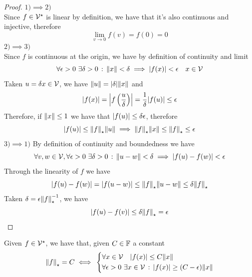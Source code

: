 \documentclass[../complete.tex]{subfiles}
\begin{document}
\begin{proof}
	$1)\implies{}2)$\\
	Since $f\in\mathcal{V}^\star$ is linear by definition, we have that it's also continuous and injective, therefore
	\begin{equation*}
		\lim_{v\to0}f(v)=f(0)=0
	\end{equation*}
	$2)\implies{}3)$\\
	Since $f$ is continuous at the origin, we have by definition of continuity and limit
	\begin{equation*}
		\forall\epsilon>0\ \exists\delta>0\st\norm{x}<\delta\implies{}\abs{f(x)}<\epsilon\quad x\in\V
	\end{equation*}
	Taken $u=\delta x\in\mathcal{V}$, we have $\norm{u}=\abs{\delta}\norm{x}$ and
	\begin{equation*}
		\abs{f(x)}=\abs{f\left( \frac{u}{\delta} \right)}=\frac{1}{\delta}\abs{f(u)}\le\epsilon
	\end{equation*}
	Therefore, if $\norm{x}\le1$ we have that $\abs{f(u)}\le\delta\epsilon$, therefore
	\begin{equation*}
		\abs{f(u)}\le\norm{f}_{\star}\norm{u}\implies{}\norm{f}_{\star}\norm{x}\le\norm{f}_{\star}\le\epsilon
	\end{equation*}
	$3)\implies{}1)$
	By definition of continuity and boundedness we have
	\begin{equation*}
		\forall v,w\in\V,\forall\epsilon>0\ \exists\delta>0\st\norm{u-w}<\delta\implies{}\abs{f(u)-f(w)}<\epsilon
	\end{equation*}
	Through the linearity of $f$ we have
	\begin{equation*}
		\abs{f(u)-f(w)}=\abs{f(u-w)}\le\norm{f}_{\star}\norm{u-w}\le\delta\norm{f}_{\star}
	\end{equation*}
	Taken $\delta=\epsilon\norm{f}_{\star}^{-1}$, we have
	\begin{equation*}
		\abs{f(u)-f(v)}\le\delta\norm{f}_{\star}=\epsilon
	\end{equation*}
\end{proof}
\begin{cor}
	Given $f\in\mathcal{V}^\star$, we have that, given $C\in\mathbb{F}$ a constant
	\begin{equation*}
		\norm{f}_{\star}=C\iff{}\begin{dcases}\forall x\in\mathcal{V}\quad\abs{f(x)}\le C\norm{x}\\\forall\epsilon>0\ \exists x\in\mathcal{V}\, :\, \abs{f(x)}\ge(C-\epsilon)\norm{x}\end{dcases}
	\end{equation*}
\end{cor}
\end{document}
